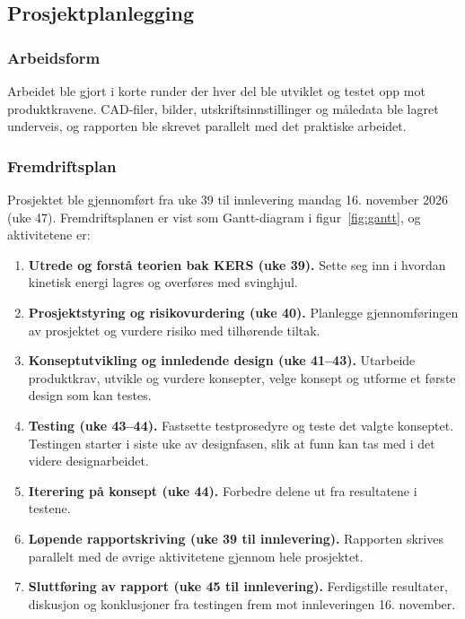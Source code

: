 \subsection{Prosjektplanlegging}
\label{sec:prosjektplan}
\subsubsection{Arbeidsform}
Arbeidet ble gjort i korte runder der hver del ble utviklet og testet opp mot produktkravene. CAD-filer, bilder, utskriftsinnstillinger og måledata ble lagret underveis, og rapporten ble skrevet parallelt med det praktiske arbeidet.

\subsubsection{Fremdriftsplan}
Prosjektet ble gjennomført fra uke 39 til innlevering mandag 16. november 2026 (uke 47). Fremdriftsplanen er vist som Gantt-diagram i figur~\ref{fig:gantt}, og aktivitetene er:
\begin{enumerate}
    \item \textbf{Utrede og forstå teorien bak KERS (uke 39).} Sette seg inn i hvordan kinetisk energi lagres og overføres med svinghjul.
    \item \textbf{Prosjektstyring og risikovurdering (uke 40).} Planlegge gjennomføringen av prosjektet og vurdere risiko med tilhørende tiltak.
    \item \textbf{Konseptutvikling og innledende design (uke 41--43).} Utarbeide produktkrav, utvikle og vurdere konsepter, velge konsept og utforme et første design som kan testes.
    \item \textbf{Testing (uke 43--44).} Fastsette testprosedyre og teste det valgte konseptet. Testingen starter i siste uke av designfasen, slik at funn kan tas med i det videre designarbeidet.
    \item \textbf{Iterering på konsept (uke 44).} Forbedre delene ut fra resultatene i testene.
    \item \textbf{Løpende rapportskriving (uke 39 til innlevering).} Rapporten skrives parallelt med de øvrige aktivitetene gjennom hele prosjektet.
    \item \textbf{Sluttføring av rapport (uke 45 til innlevering).} Ferdigstille resultater, diskusjon og konklusjoner fra testingen frem mot innleveringen 16. november.
\end{enumerate}

